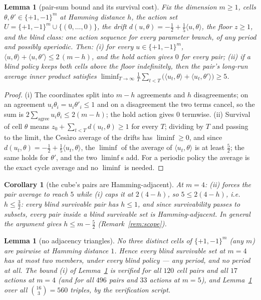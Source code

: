 \documentclass[10pt,twocolumn]{article}
\theoremstyle{plain}
\newtheorem{lemma}[theorem]{Lemma}
\newtheorem{corollary}[theorem]{Corollary}
\theoremstyle{definition}
\theoremstyle{remark}
\begin{document}
\begin{lemma}[pair-sum bound and its survival cost]\label{lem:pairsum}
Fix the dimension \(m \ge 1\), cells \(\theta, \theta' \in
\{+1,-1\}^{m}\) at Hamming distance \(h\), the action set
\(U = \{+1,-1\}^{m} \cup \{(0,\dots,0)\}\), the drift
\(d(u, \theta) = -\tfrac12 + \tfrac15\langle u, \theta\rangle\),
the floor \(z \ge 1\), and the blind class: one action sequence for
every parameter branch, of any period and possibly aperiodic. Then:
(i) for every \(u \in \{+1,-1\}^{m}\),
\(\langle u, \theta\rangle + \langle u, \theta'\rangle
\le 2\,(m - h)\), and the hold action gives \(0\) for every pair;
(ii) if a blind policy keeps both cells above the floor indefinitely,
then the pair's long-run average inner product satisfies
\(\liminf_{T \to \infty} \frac1T \sum_{t < T}
\bigl(\langle u_{t}, \theta\rangle + \langle u_{t},
\theta'\rangle\bigr) \ge 5\).
\end{lemma}

\begin{proof}
(i) The coordinates split into \(m - h\) agreements and \(h\)
disagreements; on an agreement \(u_{i}\theta_{i} = u_{i}\theta'_{i}
\le 1\) and on a disagreement the two terms cancel, so the sum is
\(2 \sum_{\text{agree}} u_{i}\theta_{i} \le 2(m-h)\); the hold
action gives \(0\) termwise. (ii) Survival of cell \(\theta\) means
\(z_{0} + \sum_{t < T} d(u_{t}, \theta) \ge 1\) for every \(T\);
dividing by \(T\) and passing to the limit, the Ces\`aro average of
the drifts has \(\liminf \ge 0\), and since
\(d(u_{t}, \theta) = -\tfrac12 + \tfrac15\langle u_{t},
\theta\rangle\), the \(\liminf\) of the average of
\(\langle u_{t}, \theta\rangle\) is at least
\(\tfrac52\); the same holds for \(\theta'\), and the two
\(\liminf\)s add. For a periodic policy the average is the exact
cycle average and no \(\liminf\) is needed.
\end{proof}

\begin{corollary}[the cube's pairs are Hamming-adjacent]
\label{cor:hamming}
At \(m = 4\): (ii) forces the pair average to reach \(5\) while (i)
caps it at \(2(4 - h)\), so \(5 \le 2(4 - h)\), i.e.\
\(h \le \tfrac32\): every blind survivable pair has \(h \le 1\),
and since survivability passes to subsets, every pair inside a blind
survivable set is Hamming-adjacent. In general the argument gives
\(h \le m - \tfrac52\) (Remark~\ref{rem:scope}).
\end{corollary}

\begin{lemma}[no adjacency triangles]\label{lem:triangle}
No three distinct cells of \(\{+1,-1\}^{m}\) (any \(m\)) are
pairwise at Hamming distance \(1\). Hence every blind survivable set
at \(m = 4\) has at most two members, under every blind policy ---
any period, and no period at all. The bound (i) of
Lemma~\ref{lem:pairsum} is verified for all \(120\) cell pairs and
all \(17\) actions at \(m = 4\) (and for all \(496\) pairs and
\(33\) actions at \(m = 5\)), and
Lemma~\ref{lem:triangle} over all \(\binom{16}{3} = 560\) triples, by the verification script.
\end{lemma}
\end{document}
